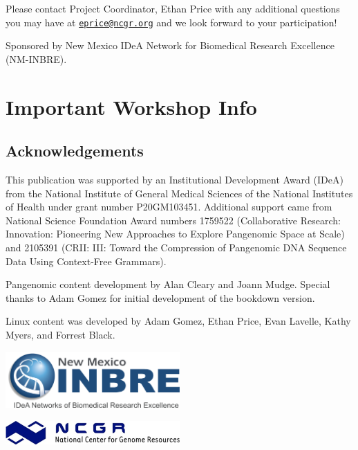 \documentclass[
]{book}
\begin{document}
Please contact Project Coordinator, Ethan Price with any additional questions you may have at \href{mailto:eprice@ncgr.org}{\nolinkurl{eprice@ncgr.org}} and we look forward to your participation!

Sponsored by New Mexico IDeA Network for Biomedical Research Excellence (NM-INBRE).

\hypertarget{important-workshop-info}{%
\chapter*{Important Workshop Info}\label{important-workshop-info}}

\hypertarget{acknowledgements}{%
\section*{Acknowledgements}\label{acknowledgements}}

This publication was supported by an Institutional Development Award (IDeA) from the National Institute of General Medical Sciences of the National Institutes of Health under grant number P20GM103451. Additional support came from National Science Foundation Award numbers 1759522 (Collaborative Research: Innovation: Pioneering New Approaches to Explore Pangenomic Space at Scale) and 2105391 (CRII: III: Toward the Compression of Pangenomic DNA Sequence Data Using Context-Free Grammars).

Pangenomic content development by Alan Cleary and Joann Mudge. Special thanks to Adam Gomez for initial development of the bookdown version.

Linux content was developed by Adam Gomez, Ethan Price, Evan Lavelle, Kathy Myers, and Forrest Black.

\includegraphics[width=0.5\textwidth,height=\textheight]{./Figures/INBRE_Logo_Grad_transparent-2019.png}

\includegraphics[width=0.5\textwidth,height=\textheight]{./Figures/ncgr.png}
\end{document}
